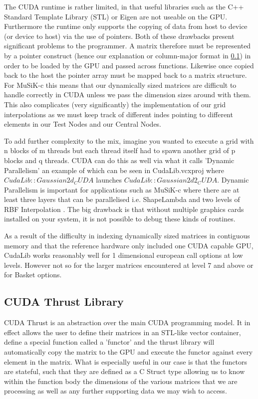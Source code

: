 \documentclass[a4paper]{amsart}
\begin{document}
The CUDA runtime is rather limited, in that useful libraries such as the C++ Standard Template Library (STL) or Eigen are not useable on the GPU. Furthermore the runtime only supports the copying of data from host to device (or device to host) via the use of pointers. Both of these drawbacks present significant problems to the programmer. A matrix therefore must be represented by a pointer construct (hence our explanation or column-major format in \ref{}) in order to be loaded by the GPU and passed across functions. Likewise once copied back to the host the pointer array must be mapped back to a matrix structure. For MuSiK-c this means that our dynamically sized matrices are difficult to handle correctly in CUDA unless we pass the dimension sizes around with them. This also complicates (very significantly) the implementation of our grid interpolations as we must keep track of different indes pointing to different elements in our Test Nodes and our Central Nodes.

To add further complexity to the mix, imagine you wanted to execute a grid with n blocks of m threads but each thread itself had to spawn another grid of p blocks and q threads. CUDA can do this as well via what it calls 'Dynamic Parallelism' an example of which can be seen in CudaLib.vcxproj where $CudaLib::Gaussian2d_CUDA$ launches $CudaLib::Gaussian2d2_CUDA$. Dynamic Parallelism is important for applications such as MuSiK-c where there are at least three layers that can be parallelised i.e. ShapeLambda and two levels of RBF Interpolation . The big drawback is that without multiple graphics cards installed on your system, it is not possible to debug these kinds of routines. 

As a result of the difficulty in indexing dynamically sized matrices in contiguous memory and that the reference hardware only included one CUDA capable GPU, CudaLib works reasonably well for 1 dimensional european call options at low levels. However not so for the larger matrices encountered at level 7 and above or for Basket options.


\subsection{CUDA Thrust Library}

CUDA Thrust is an abstraction over the main CUDA programming model. It in effect allows the user to define their matrices in an STL-like vector container, define a special function called a 'functor' and the thrust library will automatically copy the matrix to the GPU and execute the functor against every element in the matrix. What is especially useful in our case is that the functors are stateful, such that they are defined as a C Struct type allowing us to know within the function body the dimensions of the various matrices that we are processing as well as any further supporting data we may wish to access.
\end{document}

